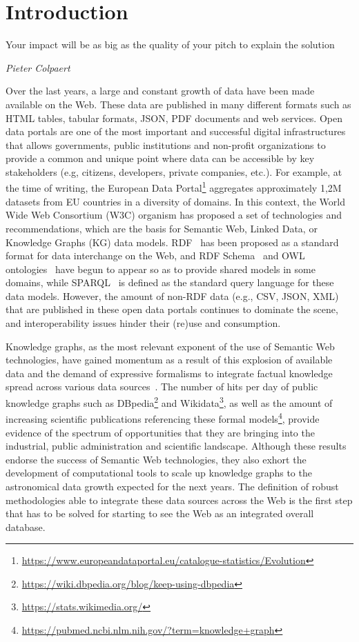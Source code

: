 \chapter{Introduction}
\label{chap:intro}

\epigraph{Your impact will be as big as the quality of your pitch to explain the solution}{\textit{Pieter Colpaert}}

Over the last years, a large and constant growth of data have been made available on the Web. These data are published in many different formats such as HTML tables, tabular formats, JSON, PDF documents and web services. Open data portals are one of the most important and successful digital infrastructures that allows governments, public institutions and non-profit organizations to provide a common and unique point where data can be accessible by key stakeholders (e.g, citizens, developers, private companies, etc.). For example, at the time of writing, the European Data Portal\footnote{\url{https://www.europeandataportal.eu/catalogue-statistics/Evolution}} aggregates approximately 1,2M datasets from EU countries in a diversity of domains. In this context, the World Wide Web Consortium (W3C) organism has proposed a set of technologies and recommendations, which are the basis for Semantic Web, Linked Data, or Knowledge Graphs (KG) data models. RDF~\citep{brickley1999resource} has been proposed as a standard format for data interchange on the Web, and RDF Schema~\citep{brickley2014rdf} and OWL ontologies~\citep{mcguinness2004owl} have begun to appear so as to provide shared models in some domains, while SPARQL~\citep{perez2009semantics} is defined as the standard query language for these data models. However, the amount of non-RDF data (e.g., CSV, JSON, XML) that are published in these open data portals continues to dominate the scene, and interoperability issues hinder their (re)use and consumption. 

Knowledge graphs, as the most relevant exponent of the use of Semantic Web technologies, have gained momentum as a result of this explosion of available data and the demand of expressive formalisms to integrate factual knowledge spread across various data sources~\citep{abs-2003-02320}. The number of hits per day of public knowledge graphs such as DBpedia\footnote{\url{https://wiki.dbpedia.org/blog/keep-using-dbpedia}} and Wikidata\footnote{\url{https://stats.wikimedia.org/}}, as well as the amount of increasing scientific publications referencing these formal models\footnote{\url{https://pubmed.ncbi.nlm.nih.gov/?term=knowledge+graph}}, provide evidence of the spectrum of opportunities that they are bringing into the industrial, public administration and scientific landscape. Although these results endorse the success of Semantic Web technologies, they also exhort the development of computational tools to scale up knowledge graphs to the astronomical data growth expected for the next years. The definition of robust methodologies able to integrate these data sources across the Web is the first step that has to be solved for starting to see the Web as an integrated overall database.


